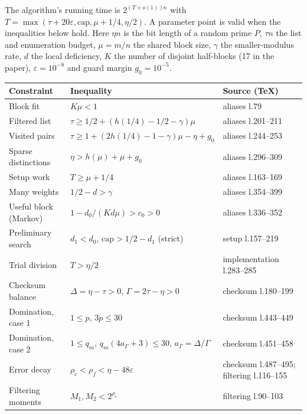 \documentclass[11pt]{article}
\newcommand{\eps}{\varepsilon}
\theoremstyle{plain}
\begin{document}
The algorithm's running time is $2^{(T+o(1))n}$ with $T = \max(\tau + 20\eps, \mathrm{cap}, \mu + 1/4, \eta/2)$. A parameter point is valid when the inequalities below hold. Here $\eta n$ is the bit length of a random prime $P$, $\tau n$ the list and enumeration budget, $\mu = m/n$ the shared block size, $\gamma$ the smaller-modulus rate, $d$ the local deficiency, $K$ the number of disjoint half-blocks (17 in the paper), $\eps = 10^{-8}$ and guard margin $g_0 = 10^{-5}$.

\begin{center}
\small
\begin{tabularx}{\linewidth}{>{\raggedright\arraybackslash}p{3.2cm} L >{\raggedright\arraybackslash}p{3.6cm}}
\toprule
Constraint & Inequality & Source (TeX) \\
\midrule
Block fit & $K\mu < 1$ & aliases l.79 \\
Filtered list & $\tau \ge 1/2 + (h(1/4) - 1/2 - \gamma)\mu$ & aliases l.201--211 \\
Visited pairs & $\tau \ge 1 + (2h(1/4) - 1 - \gamma)\mu - \eta + g_0$ & aliases l.244--253 \\
Sparse distinctions & $\eta > h(\mu) + \mu + g_0$ & aliases l.296--309 \\
Setup work & $T \ge \mu + 1/4$ & aliases l.163--169 \\
Many weights & $1/2 - d > \gamma$ & aliases l.354--399 \\
Useful block (Markov) & $1 - d_0/(K d \mu) > c_0 > 0$ & aliases l.336--352 \\
Preliminary search & $d_1 < d_0$, $\mathrm{cap} > 1/2 - d_1$ (strict) & setup l.157--219 \\
Trial division & $T > \eta/2$ & implementation l.283--285 \\
Checksum balance & $\Delta = \eta - \tau > 0$, $\Gamma = 2\tau - \eta > 0$ & checksum l.180--199 \\
Domination, case 1 & $1 \le p$, $3p \le 30$ & checksum l.443--449 \\
Domination, case 2 & $1 \le q_m$, $q_m(4a_\Gamma + 3) \le 30$, $a_\Gamma = \Delta/\Gamma$ & checksum l.451--458 \\
Error decay & $\rho_c < \rho_f < \eta - 48\eps$ & checksum l.487--495; filtering l.116--155 \\
Filtering moments & $M_1, M_2 < 2^{\rho_c}$ & filtering l.90--103 \\
\bottomrule
\end{tabularx}
\end{center}
\end{document}
